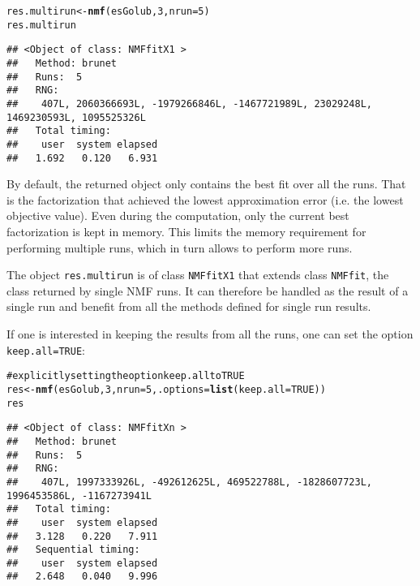 \documentclass[a4paper]{article}\usepackage{graphicx, color}
\makeatletter
\newcommand{\hlfunctioncall}[1]{\textcolor[rgb]{0.501960784313725,0,0.329411764705882}{\textbf{#1}}}%
\newcommand{\hlcomment}[1]{\textcolor[rgb]{0.180392156862745,0.6,0.341176470588235}{#1}}%
\newenvironment{kframe}{%
 \def\at@end@of@kframe{}%
 \ifinner\ifhmode%
  \def\at@end@of@kframe{\end{minipage}}%
  \begin{minipage}{\columnwidth}%
 \fi\fi%
 \def\FrameCommand##1{\hskip\@totalleftmargin \hskip-\fboxsep
 \colorbox{shadecolor}{##1}\hskip-\fboxsep
     \hskip-\linewidth \hskip-\@totalleftmargin \hskip\columnwidth}%
 \MakeFramed {\advance\hsize-\width
   \@totalleftmargin\z@ \linewidth\hsize
   \@setminipage}}%
 {\par\unskip\endMakeFramed%
 \at@end@of@kframe}
\newenvironment{knitrout}{}{} %
\let\code=\texttt
\makeatother
\begin{document}
\begin{knitrout}
\color{fgcolor}\begin{kframe}
\begin{alltt}
res.multirun <- \hlfunctioncall{nmf}(esGolub, 3, nrun = 5)
res.multirun
\end{alltt}
\begin{verbatim}
## <Object of class: NMFfitX1 >
##   Method: brunet 
##   Runs:  5 
##   RNG:
##    407L, 2060366693L, -1979266846L, -1467721989L, 23029248L, 1469230593L, 1095525326L 
##   Total timing:
##    user  system elapsed 
##   1.692   0.120   6.931
\end{verbatim}
\end{kframe}
\end{knitrout}


By default, the returned object only contains the best fit over all the runs.
That is the factorization that achieved the lowest approximation error (i.e. the lowest objective value).
Even during the computation, only the current best factorization is kept in memory.
This limits the memory requirement for performing multiple runs, which in turn allows to perform more runs.

The object \code{res.multirun} is of class \code{NMFfitX1} that extends class \code{NMFfit}, the class returned by single NMF runs. 
It can therefore be handled as the result of a single run and benefit from all the methods defined for single run results.

\medskip
If one is interested in keeping the results from all the runs, one can set the option \code{keep.all=TRUE}:

\begin{knitrout}
\color{fgcolor}\begin{kframe}
\begin{alltt}
\hlcomment{# explicitly setting the option keep.all to TRUE}
res <- \hlfunctioncall{nmf}(esGolub, 3, nrun = 5, .options = \hlfunctioncall{list}(keep.all = TRUE))
res
\end{alltt}
\begin{verbatim}
## <Object of class: NMFfitXn >
##   Method: brunet 
##   Runs:  5 
##   RNG:
##    407L, 1997333926L, -492612625L, 469522788L, -1828607723L, 1996453586L, -1167273941L 
##   Total timing:
##    user  system elapsed 
##   3.128   0.220   7.911 
##   Sequential timing:
##    user  system elapsed 
##   2.648   0.040   9.996
\end{verbatim}
\end{kframe}
\end{knitrout}
\end{document}
